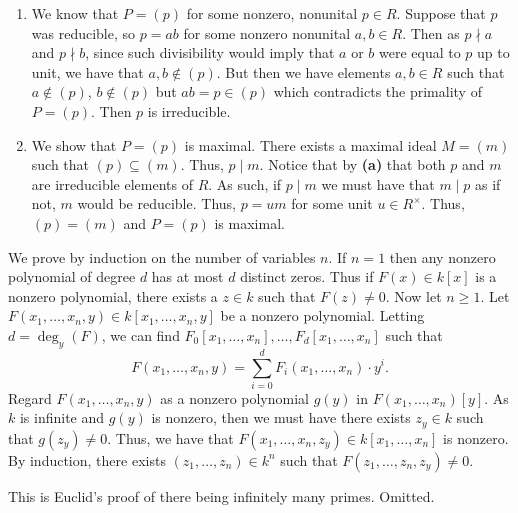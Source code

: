 \documentclass[letterpaper, 11pt, oneside]{book}
\begin{document}
\begin{sol}\label{ex:Curves_1.3}
  \begin{enumerate}[label= (\alph*)]
    \item We know that $P = (p)$ for some nonzero, nonunital $p \in R$.
          Suppose that $p$ was reducible, so $p = ab$ for some nonzero nonunital $a, b \in R$.
          Then as $p \nmid a$ and $p \nmid b$, since such divisibility would imply that $a$ or $b$ were equal to $p$ up to unit, we have that $a, b \notin (p)$.
          But then we have elements $a, b \in R$ such that $a \notin (p)$, $b \notin (p)$ but $ab = p \in (p)$ which contradicts the primality of $P = (p)$.
          Then $p$ is irreducible.
    \item We show that $P = (p)$ is maximal.
          There exists a maximal ideal $M = (m)$ such that $(p) \subseteq (m)$.
          Thus, $p \mid m$.
          Notice that by \textbf{(a)} that both $p$ and $m$ are irreducible elements of $R$.
          As such, if $p \mid m$ we must have that $m \mid p$ as if not, $m$ would be reducible.
          Thus, $p = um$ for some unit $u \in R^{\times}$.
          Thus, $(p) = (m)$ and $P = (p)$ is maximal.
  \end{enumerate}
\end{sol}

\begin{sol}\label{ex:Curves_1.4}
  We prove by induction on the number of variables $n$.
  If $n = 1$ then any nonzero polynomial of degree $d$ has at most $d$ distinct zeros.
  Thus if $F(x) \in k[x]$ is a nonzero polynomial, there exists a $z \in k$ such that $F(z) \neq 0$.
  Now let $n \geq 1$.
  Let $F(x_{1}, \ldots, x_{n}, y) \in k[x_{1}, \ldots, x_{n}, y]$ be a nonzero polynomial.
  Letting $d = \deg_{y}(F)$, we can find $F_{0}[x_{1}, \ldots, x_{n}], \ldots, F_{d}[x_{1}, \ldots, x_{n}]$ such that
  \[
    F(x_{1}, \ldots, x_{n}, y) = \sum_{i = 0}^{d} F_{i}(x_{1}, \ldots, x_{n}) \cdot y^{i}.
  \]
  Regard $F(x_{1}, \ldots, x_{n}, y)$ as a nonzero polynomial $g(y)$ in $F(x_{1}, \ldots, x_{n})[y]$.
  As $k$ is infinite and $g(y)$ is nonzero, then we must have there exists $z_{y} \in k$ such that $g(z_{y}) \neq 0$.
  Thus, we have that $F(x_{1}, \ldots, x_{n}, z_{y}) \in k[x_{1}, \ldots, x_{n}]$ is nonzero.
  By induction, there exists $(z_{1}, \ldots, z_{n}) \in k^{n}$ such that $F(z_{1}, \ldots, z_{n}, z_{y}) \neq 0$.
\end{sol}

\begin{sol}\label{ex:Curves_1.5}
  This is Euclid's proof of there being infinitely many primes.
  Omitted.
\end{sol}
\end{document}
